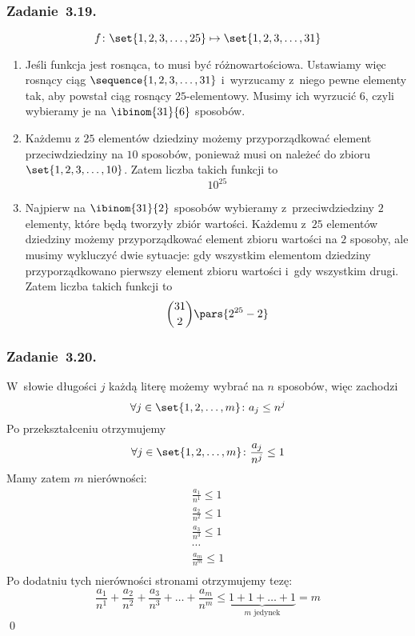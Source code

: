 \subsubsection*{Zadanie~3.19.}
\begin{equation*}
    f\colon \set{1, 2, 3, \ldots, 25} \mapsto \set{1, 2, 3, \ldots, 31}
\end{equation*}
\begin{enumerate}[label={\alph*)}]
    \item Jeśli funkcja jest rosnąca, to musi być różnowartościowa. Ustawiamy więc rosnący ciąg \(\sequence{1, 2, 3, \ldots, 31}\) i~wyrzucamy z~niego pewne elementy tak, aby powstał ciąg rosnący \(25\)-elementowy. Musimy ich wyrzucić \(6\), czyli wybieramy je na \(\ibinom{31}{6}\) sposobów.
    \item Każdemu z \(25\) elementów dziedziny możemy przyporządkować element przeciwdziedziny na \(10\) sposobów, ponieważ musi on należeć do zbioru \(\set{1, 2, 3, \ldots, 10}\). Zatem liczba takich funkcji to
        \begin{equation*}
            10^{25}
        \end{equation*}
    \item Najpierw na \(\ibinom{31}{2}\) sposobów wybieramy z~przeciwdziedziny \(2\) elementy, które będą tworzyły zbiór wartości. Każdemu z~\(25\) elementów dziedziny możemy przyporządkować element zbioru wartości na \(2\) sposoby, ale musimy wykluczyć dwie sytuacje: gdy wszystkim elementom dziedziny przyporządkowano pierwszy element zbioru wartości i~gdy wszystkim drugi. Zatem liczba takich funkcji to
        \begin{equation*}
            \binom{31}{2}\pars{2^{25} - 2}
        \end{equation*}
\end{enumerate}
\subsubsection*{Zadanie~3.20.}
W~słowie długości \(j\) każdą literę możemy wybrać na \(n\) sposobów, więc zachodzi
\begin{equation*}
    \forall j \in \set{1, 2, \ldots, m}\colon a_j \leq n^j
\end{equation*}
Po przekształceniu otrzymujemy
\begin{equation*}
    \forall j \in \set{1, 2, \ldots, m}\colon \frac{a_j}{n^j} \leq 1
\end{equation*}
Mamy zatem \(m\) nierówności:
\begin{gather*}
    \frac{a_1}{n^1} \leq 1\\
    \frac{a_2}{n^2} \leq 1\\
    \frac{a_3}{n^3} \leq 1\\
    \cdots\\
    \frac{a_m}{n^m} \leq 1\\
\end{gather*}
Po dodatniu tych nierówności stronami otrzymujemy tezę:
\begin{equation*}
    \frac{a_1}{n^1} + \frac{a_2}{n^2} + \frac{a_3}{n^3} + \ldots + \frac{a_m}{n^m} \leq \underbrace{1 + 1 + \ldots + 1}_{m \text{ jedynek}} = m
\end{equation*}
\qed
